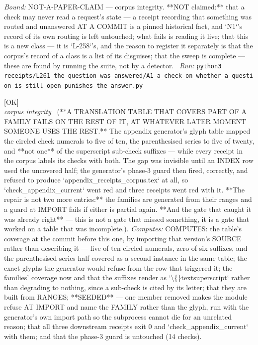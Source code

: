 \begin{description}
 \emph{Bound:} NOT-A-PAPER-CLAIM --- corpus integrity. **NOT claimed:** that a check may never read a request's state --- a receipt recording that something was routed and unanswered AT A COMMIT is a pinned historical fact, and `N1`'s record of its own routing is left untouched; what fails is reading it live; that this is a new class --- it is `L-258`'s, and the reason to register it separately is that the corpus's record of a class is a list of its disguises; that the sweep is complete --- these are found by running the suite, not by a detector.
\ \emph{Run:} \texttt{python3 receipts/L261\_the\_question\_was\_answered/A1\_a\_check\_on\_whether\_a\_question\_is\_still\_open\_punishes\_the\_answer.py}
\item[\label{rcpt:F1_a_table_that_covers_half_a_family_fails_on_the_rest_of_it_later}\texttt{F1\_a\_table\_that\_covers\_half\_a\_family\_fails\_on\_the\_rest\_of\_it\_later}]\hfill\textsf{[OK]}\\
\textit{corpus integrity} \ (**A TRANSLATION TABLE THAT COVERS PART OF A FAMILY FAILS ON THE REST OF IT, AT WHATEVER LATER MOMENT SOMEONE USES THE REST.** The appendix generator's glyph table mapped the circled check numerals to five of ten, the parenthesised series to five of twenty, and **not one** of the superscript sub-check suffixes --- while every receipt in the corpus labels its checks with both. The gap was invisible until an INDEX row used the uncovered half; the generator's phase-3 guard then fired, correctly, and refused to produce `appendix\_receipts\_corpus.tex` at all, so `check\_appendix\_current` went red and three receipts went red with it. **The repair is not two more entries:** the families are generated from their ranges and a guard at IMPORT fails if either is partial again. **And the gate that caught it was already right** --- this is not a gate that missed something, it is a gate that worked on a table that was incomplete.). 
\emph{Computes:} COMPUTES: the table's coverage at the commit before this one, by importing that version's SOURCE rather than describing it --- five of ten circled numerals, zero of six suffixes, and the parenthesised series half-covered as a second instance in the same table; the exact glyphs the generator would refuse from the row that triggered it; the families' coverage now and that the suffixes render as `\textbackslash\{\}textsuperscript` rather than degrading to nothing, since a sub-check is cited by its letter; that they are built from RANGES; **SEEDED** --- one member removed makes the module refuse AT IMPORT and name the FAMILY rather than the glyph, run with the generator's own import path so the subprocess cannot die for an unrelated reason; that all three downstream receipts exit 0 and `check\_appendix\_current` with them; and that the phase-3 guard is untouched (14 checks).

\end{description}
